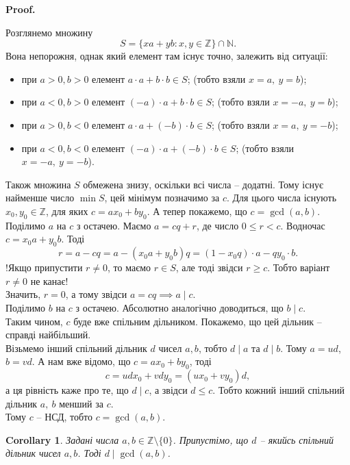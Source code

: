\documentclass[a4paper, 10pt]{article}
\makeatletter
\theoremstyle{theoremdd}
\theoremstyle{theoremdd}
\theoremstyle{theoremdd}
\theoremstyle{theoremdd}
\theoremstyle{theoremdd}
\theoremstyle{theoremdd}
\theoremstyle{theoremdd}
\theoremstyle{theoremdd}
\newtheorem{corollary}[theorem]{Corollary}
\renewenvironment{proof}[1][Proof.\\]{\par
\pushQED{\hfill \qed}%
\normalfont \topsep6\p@\@plus6\p@\relax
\trivlist
\item\relax
{\bfseries
#1\@addpunct{.}}\hspace\labelsep\ignorespaces
}{%
\popQED\endtrivlist\@endpefalse
}
\makeatother
\begin{document}
\begin{proof}
Розглянемо множину \[
S = \{xa+yb: x,y \in \mathbb{Z}\} \cap \mathbb{N}.
\]
Вона непорожня, однак який елемент там існує точно, залежить від ситуації:
\begin{itemize}[nosep,wide=0pt]
\item при $a > 0, b > 0$ елемент $a \cdot a + b \cdot b \in S$; (тобто взяли $x = a,\ y = b$);
\item при $a < 0, b > 0$ елемент $(-a) \cdot a + b \cdot b \in S$; (тобто взяли $x = -a,\ y = b$);
\item при $a > 0, b < 0$ елемент $a \cdot a + (-b) \cdot b \in S$; (тобто взяли $x = a,\ y = -b$);
\item при $a < 0, b < 0$ елемент $(-a) \cdot a + (-b) \cdot b \in S$; (тобто взяли $x = -a,\ y = -b$).
\end{itemize}
Також множина $S$ обмежена знизу, оскільки всі числа -- додатні. Тому існує найменше число $\min S$, цей мінімум позначимо за $c$. Для цього числа існують $x_0,y_0 \in \mathbb{Z}$, для яких $c = ax_0 + by_0$. А тепер покажемо, що $c = \gcd(a,b)$.\\
Поділимо $a$ на $c$ з остачею. Маємо $a = cq + r$, де число $0 \leq r < c$. Водночас $c = x_0a+y_0b$. Тоді
\[
r = a - cq = a - (x_0a+y_0b)q = (1-x_0q)\cdot a - qy_0 \cdot b.
\]
!Якщо припустити $r \neq 0$, то маємо $r \in S$, але тоді звідси $r \geq c$. Тобто варіант $r \neq 0$ не канає!\\
Значить, $r = 0$, а тому звідси $a = cq \implies a \mid c$.\\
Поділимо $b$  на $c$ з остачею. Абсолютно аналогічно доводиться, що $b \mid c$.\\
Таким чином, $c$ буде вже спільним дільником. Покажемо, що цей дільник -- справді найбільший.\\
Візьмемо інший спільний дільник $d$ чисел $a,b$, тобто $d \mid a$ та $d \mid b$. Тому $a = ud$, $b = vd$. А нам вже відомо, що $c = ax_0 + by_0$, тоді
\[ 
c = udx_0 + vdy_0 = (ux_0 + vy_0)d,
\]
а ця рівність каже про те, що $d \mid c$, а звідси $d \leq c$. Тобто кожний інший спільний дільник $a,\ b$ менший за $c$.\\
Тому $c$ -- НСД, тобто $c = \gcd(a,b)$.
\end{proof}

\begin{corollary}
Задані числа $a,b \in \mathbb{Z} \setminus \{0\}$. Припустімо, що $d$ -- якийсь спільний дільник чисел $a,b$. Тоді $d \mid \gcd(a,b)$.
\end{corollary}
\end{document}
